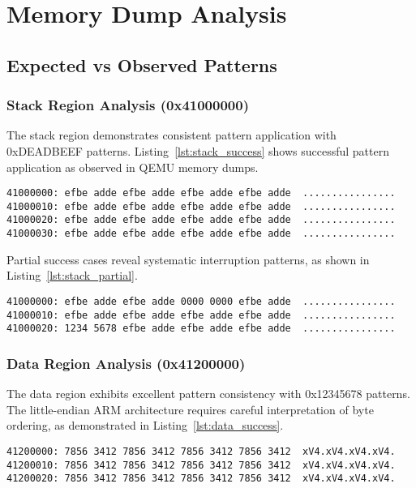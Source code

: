 \documentclass[11pt,a4paper]{article}
\begin{document}
\section{Memory Dump Analysis}

\subsection{Expected vs Observed Patterns}

\subsubsection{Stack Region Analysis (0x41000000)}

The stack region demonstrates consistent pattern application with 0xDEADBEEF patterns. Listing~\ref{lst:stack_success} shows successful pattern application as observed in QEMU memory dumps.

\begin{lstlisting}[style=hexdump, caption=Successful Stack Pattern Application, label=lst:stack_success]
41000000: efbe adde efbe adde efbe adde efbe adde  ................
41000010: efbe adde efbe adde efbe adde efbe adde  ................
41000020: efbe adde efbe adde efbe adde efbe adde  ................
41000030: efbe adde efbe adde efbe adde efbe adde  ................
\end{lstlisting}

Partial success cases reveal systematic interruption patterns, as shown in Listing~\ref{lst:stack_partial}.

\begin{lstlisting}[style=hexdump, caption=Partial Stack Pattern with Interruption, label=lst:stack_partial]
41000000: efbe adde efbe adde 0000 0000 efbe adde  ................
41000010: efbe adde efbe adde efbe adde efbe adde  ................
41000020: 1234 5678 efbe adde efbe adde efbe adde  ................
\end{lstlisting}

\subsubsection{Data Region Analysis (0x41200000)}

The data region exhibits excellent pattern consistency with 0x12345678 patterns. The little-endian ARM architecture requires careful interpretation of byte ordering, as demonstrated in Listing~\ref{lst:data_success}.

\begin{lstlisting}[style=hexdump, caption=Data Region Pattern with ARM Little-Endian Ordering, label=lst:data_success]
41200000: 7856 3412 7856 3412 7856 3412 7856 3412  xV4.xV4.xV4.xV4.
41200010: 7856 3412 7856 3412 7856 3412 7856 3412  xV4.xV4.xV4.xV4.
41200020: 7856 3412 7856 3412 7856 3412 7856 3412  xV4.xV4.xV4.xV4.
\end{lstlisting}
\end{document}
